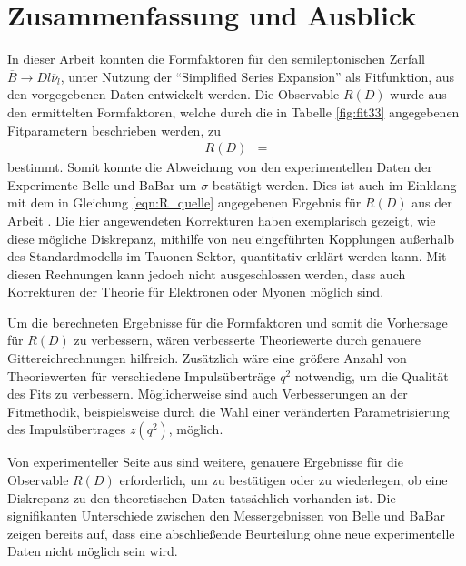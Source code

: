 \chapter{Zusammenfassung und Ausblick}

In dieser Arbeit konnten die Formfaktoren für den semileptonischen Zerfall $\overline{B} \to D l \overline{\nu}_l$, unter Nutzung der \enquote{Simplified Series Expansion} als Fitfunktion, aus den vorgegebenen Daten entwickelt werden.
Die Observable $R(D)$ wurde aus den ermittelten Formfaktoren, welche durch die in Tabelle \ref{fig:fit33} angegebenen Fitparametern beschrieben werden, zu
\begin{align*}
  R(D) &= 
\end{align*}
bestimmt.
Somit konnte die Abweichung von den experimentellen Daten der Experimente Belle und BaBar um $\sigma$ bestätigt werden.
Dies ist auch im Einklang mit dem in Gleichung \eqref{eqn:R_quelle} angegebenen Ergebnis für $R(D)$ aus der Arbeit \cite{PhysRevD.92.034506}.
Die hier angewendeten Korrekturen haben exemplarisch gezeigt, wie diese mögliche Diskrepanz, mithilfe von neu eingeführten Kopplungen außerhalb des Standardmodells im Tauonen-Sektor, quantitativ erklärt werden kann.
Mit diesen Rechnungen kann jedoch nicht ausgeschlossen werden, dass auch Korrekturen der Theorie für Elektronen oder Myonen möglich sind.

Um die berechneten Ergebnisse für die Formfaktoren und somit die Vorhersage für $R(D)$ zu verbessern, wären verbesserte Theoriewerte durch genauere Gittereichrechnungen hilfreich.
Zusätzlich wäre eine größere Anzahl von Theoriewerten für verschiedene Impulsüberträge $q^2$ notwendig, um die Qualität des Fits zu verbessern.
Möglicherweise sind auch Verbesserungen an der Fitmethodik, beispielsweise durch die Wahl einer veränderten Parametrisierung des Impulsübertrages $z(q^2)$, möglich.

Von experimenteller Seite aus sind weitere, genauere Ergebnisse für die Observable $R(D)$ erforderlich, um zu bestätigen oder zu wiederlegen, ob eine Diskrepanz zu den theoretischen Daten tatsächlich vorhanden ist.
Die signifikanten Unterschiede zwischen den Messergebnissen von Belle und BaBar zeigen bereits auf, dass eine abschließende Beurteilung ohne neue experimentelle Daten nicht möglich sein wird.
